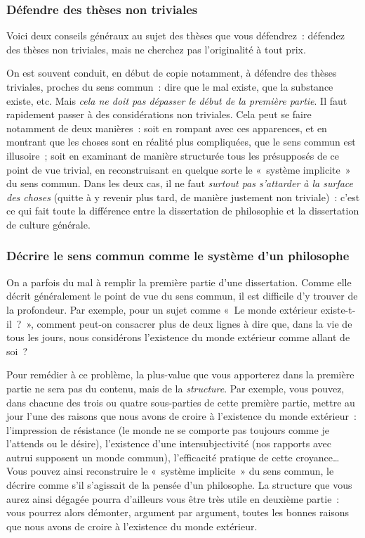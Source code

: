 \documentclass[a4paper,12pt]{article}
\begin{document}
\subsubsection{Défendre des thèses non triviales}
\label{sec-3-2-2}

Voici deux conseils généraux au sujet des thèses que vous défendrez :
défendez des thèses non triviales, mais ne cherchez pas l'originalité à
tout prix.

On est souvent conduit, en début de copie notamment, à défendre des
thèses triviales, proches du sens commun : dire que le mal existe, que
la substance existe, etc. Mais \emph{cela ne doit pas dépasser le début de la
première partie}. Il faut rapidement passer à des considérations non
triviales. Cela peut se faire notamment de deux manières : soit en
rompant avec ces apparences, et en montrant que les choses sont en
réalité plus compliquées, que le sens commun est illusoire ; soit en
examinant de manière structurée tous les présupposés de ce point de vue
trivial, en reconstruisant en quelque sorte le « système implicite » du
sens commun. Dans les deux cas, il ne faut \emph{surtout pas s'attarder à la
surface des choses} (quitte à y revenir plus tard, de manière justement
non triviale) : c'est ce qui fait toute la différence entre la
dissertation de philosophie et la dissertation de culture générale.

\subsubsection{Décrire le sens commun comme le système d'un philosophe}
\label{sec-3-2-3}

On a parfois du mal à remplir la première partie d'une dissertation.
Comme elle décrit généralement le point de vue du sens commun, il est
difficile d'y trouver de la profondeur. Par exemple, pour un sujet comme
« Le monde extérieur existe-t-il ? », comment peut-on consacrer plus de
deux lignes à dire que, dans la vie de tous les jours, nous considérons
l'existence du monde extérieur comme allant de soi ?

Pour remédier à ce problème, la plus-value que vous apporterez dans la
première partie ne sera pas du contenu, mais de la \emph{structure}. Par
exemple, vous pouvez, dans chacune des trois ou quatre sous-parties de
cette première partie, mettre au jour l'une des raisons que nous avons
de croire à l'existence du monde extérieur : l'impression de résistance
(le monde ne se comporte pas toujours comme je l'attends ou le désire),
l'existence d'une intersubjectivité (nos rapports avec autrui supposent
un monde commun), l'efficacité pratique de cette croyance\ldots{} Vous pouvez
ainsi reconstruire le « système implicite » du sens commun, le décrire
comme s'il s'agissait de la pensée d'un philosophe. La structure que
vous aurez ainsi dégagée pourra d'ailleurs vous être très utile en
deuxième partie : vous pourrez alors démonter, argument par argument,
toutes les bonnes raisons que nous avons de croire à l'existence du
monde extérieur.
\end{document}
